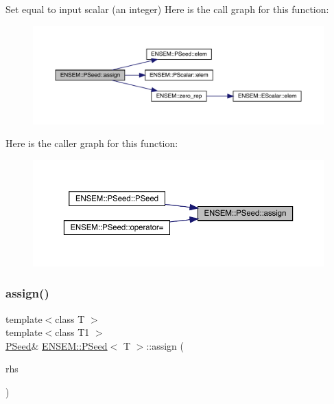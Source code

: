Set equal to input scalar (an integer) Here is the call graph for this function\+:
\nopagebreak
\begin{figure}[H]
\begin{center}
\leavevmode
\includegraphics[width=350pt]{dc/d14/classENSEM_1_1PSeed_a8d74bd21af23dfb165937c3bb546ea8f_cgraph}
\end{center}
\end{figure}
Here is the caller graph for this function\+:
\nopagebreak
\begin{figure}[H]
\begin{center}
\leavevmode
\includegraphics[width=350pt]{dc/d14/classENSEM_1_1PSeed_a8d74bd21af23dfb165937c3bb546ea8f_icgraph}
\end{center}
\end{figure}
\mbox{\label{classENSEM_1_1PSeed_a8d74bd21af23dfb165937c3bb546ea8f}} 
\subsubsection{\texorpdfstring{assign()}{assign()}\hspace{0.1cm}{\footnotesize\ttfamily [2/3]}}
{\footnotesize\ttfamily template$<$class T $>$ \\
template$<$class T1 $>$ \\
\mbox{\hyperlink{classENSEM_1_1PSeed}{P\+Seed}}\& \mbox{\hyperlink{classENSEM_1_1PSeed}{E\+N\+S\+E\+M\+::\+P\+Seed}}$<$ T $>$\+::assign (\begin{DoxyParamCaption}\item[{const \mbox{\hyperlink{classENSEM_1_1PScalar}{P\+Scalar}}$<$ T1 $>$ \&}]{rhs }\end{DoxyParamCaption})\hspace{0.3cm}{\ttfamily [inline]}}



